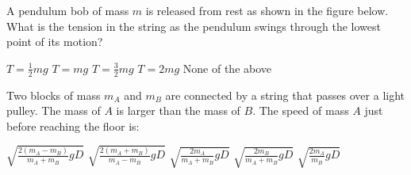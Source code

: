 \documentclass{../../../oss-apphys-exam}
\begin{document}
\begin{multicols*}{2}
\begin{questions}
    \question A pendulum bob of mass $m$ is released from rest as shown in the
    figure below. What is the tension in the string as the pendulum swings
    through the lowest point of its motion?
    \begin{center}
    \end{center}
    \begin{choices}
      \choice $\displaystyle T=\frac{1}{2}mg$
      \choice $T=mg$
      \choice $\displaystyle T=\frac{3}{2}mg$
      \choice $T=2mg$
      \choice None of the above
    \end{choices}
    \columnbreak
    
    \question Two blocks of mass $m_A$ and $m_B$ are connected by a string that
    passes over a light pulley. The mass of $A$ is larger than the mass of $B$.
    The speed of mass $A$ just before reaching the floor is:
    \begin{center}
    \end{center}
    \begin{choices}
      \choice $\displaystyle\sqrt{\frac{2(m_A-m_B)}{m_A+m_B}gD}$
      \choice $\displaystyle\sqrt{\frac{2(m_A+m_B)}{m_A-m_B}gD}$
      \choice $\displaystyle\sqrt{\frac{2m_A}{m_A+m_B}gD}$
      \choice $\displaystyle\sqrt{\frac{2m_B}{m_A+m_B}gD}$
      \choice $\displaystyle\sqrt{\frac{2m_A}{m_B}gD}$
    \end{choices}


\end{questions}
\end{multicols*}
\end{document}
